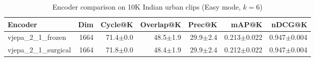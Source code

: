 \begin{table}[ht]
\centering
\caption{Encoder comparison on 10K Indian urban clips (Easy mode, $k=6$)}
\label{tab:encoder_comparison}
\begin{tabular}{lrrrrrr}
\toprule
Encoder & Dim & Cycle@K & Overlap@K & Prec@K & mAP@K & nDCG@K \\
\midrule
vjepa\_2\_1\_frozen & 1664 & 71.4{\tiny$\pm$0.0} & 48.5{\tiny$\pm$1.9} & 29.9{\tiny$\pm$2.4} & 0.213{\tiny$\pm$0.022} & 0.947{\tiny$\pm$0.004} \\
vjepa\_2\_1\_surgical & 1664 & 71.8{\tiny$\pm$0.0} & 48.4{\tiny$\pm$1.9} & 29.9{\tiny$\pm$2.4} & 0.212{\tiny$\pm$0.022} & 0.947{\tiny$\pm$0.004} \\
\bottomrule
\end{tabular}
\end{table}